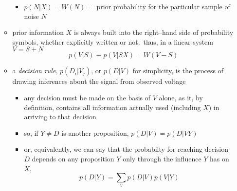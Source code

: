 \documentclass[../jaynes_prob_theory_notes.tex]{subfiles}
\begin{document}
\begin{itemize}
\begin{itemize}
\begin{itemize}
                                \item[] \(p(N|X) = W(N) =\) prior probability for the particular sample of noise \(N\)
                            \end{itemize}
                        \item prior information \(X\) is always built into the right--hand side of probability symbols, whether explicitly written or not.\ thus, in a linear system \(V = S + N\)
                            \begin{equation*} 
                                p(V|S) \equiv p(V|SX) = W(V-S)
                            \end{equation*}
                        \item a \textit{decision rule}, \(p(D_i | V_j)\), or \(p(D|V)\) for simplicity, is the process of drawing inferences about the signal from observed voltage
                            \begin{itemize} 
                                \item any decision must be made on the basis of \(V\) alone, as it, by definition, contains all information actually used (including \(X\)) in arriving to that decision
                                \item so, if \(Y \neq D\) is another proposition, \(p(D|V) = p(D|VY)\)
                                \item or, equivalently, we can say that the probabilty for reaching decision \(D\) depends on any proposition \(Y\) only through the influence \(Y\) has on \(X\),
                                    \begin{equation*} 
                                        p(D|Y) = \sum\limits_V p(D|V)p(V|Y)
                                    \end{equation*}
                            \end{itemize}
                    \end{itemize}
            \end{itemize}
\end{document}
